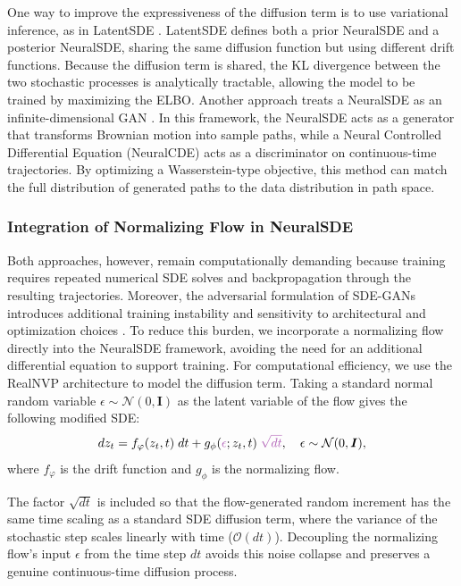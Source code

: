 One way to improve the expressiveness of the diffusion term is to use variational inference, as in LatentSDE \citep{li2020scalablegradientsstochasticdifferential}. LatentSDE defines both a prior NeuralSDE and a posterior NeuralSDE, sharing the same diffusion function but using different drift functions. Because the diffusion term is shared, the KL divergence between the two stochastic processes is analytically tractable, allowing the model to be trained by maximizing the \ac{ELBO}. Another approach treats a NeuralSDE as an infinite-dimensional \ac{GAN} \citep{kidger2021neuralsdesinfinitedimensionalgans}. In this framework, the NeuralSDE acts as a generator that transforms Brownian motion into sample paths, while a Neural Controlled Differential Equation (NeuralCDE) acts as a discriminator on continuous-time trajectories. By optimizing a Wasserstein-type objective, this method can match the full distribution of generated paths to the data distribution in path space.

\subsubsection{Integration of Normalizing Flow in NeuralSDE}
Both approaches, however, remain computationally demanding because training requires repeated numerical SDE solves and backpropagation through the resulting trajectories. Moreover, the adversarial formulation of SDE-GANs introduces additional training instability and sensitivity to architectural and optimization choices \citep{kidger2021efficient,zhang2025efficient,bartosh2025sdematching}. To reduce this burden, we incorporate a normalizing flow directly into the NeuralSDE framework, avoiding the need for an additional differential equation to support training. For computational efficiency, we use the RealNVP architecture to model the diffusion term. Taking a standard normal random variable $\epsilon\sim \mathcal{N}(0, \boldsymbol{I})$ as the latent variable of the flow gives the following modified SDE:
\begin{equation}\label{eq:flow_sde}
    dz_t = f_\varphi(z_t, t)\; dt + g_\phi({\color{Orchid} \epsilon}; z_t, t) \; {\color{Orchid}\sqrt{dt}}, \quad \epsilon\sim \mathcal{N}(0, \boldsymbol{I}),
\end{equation}
where $f_\varphi$ is the drift function and $g_\phi$ is the normalizing flow. 

The factor $\sqrt{dt}$ is included so that the flow-generated random increment has the same time scaling as a standard \ac{SDE} diffusion term, where the variance of the stochastic step scales linearly with time ($\mathcal{O}(dt)$). Decoupling the normalizing flow's input $\epsilon$ from the time step $dt$ avoids this noise collapse and preserves a genuine continuous-time diffusion process.

